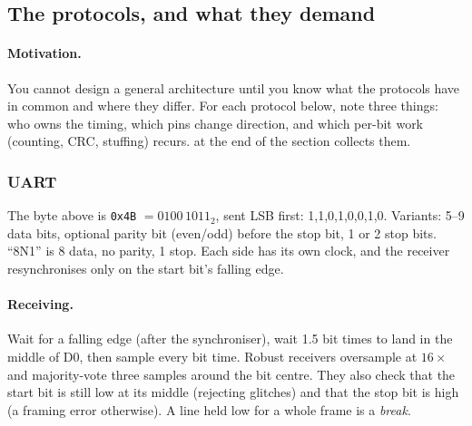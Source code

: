 \subsection{The protocols, and what they demand}\label{sec:protocols}

\paragraph{Motivation.} You cannot design a general architecture until you
know what the protocols have in common and where they differ. For each
protocol below, note three things: who owns the timing, which pins change
direction, and which per-bit work (counting, CRC, stuffing) recurs.
 at the end of the section collects them.

\subsubsection{UART}\label{sec:uart}

\begin{center}
\end{center}
The byte above is \texttt{0x4B} $=0100\,1011_2$, sent LSB first:
1,1,0,1,0,0,1,0. Variants: 5--9 data bits, optional parity bit (even/odd)
before the stop bit, 1 or 2 stop bits. ``8N1'' is 8 data, no parity, 1 stop.
Each side has its own clock, and the receiver resynchronises only on the
start bit's falling edge.

\paragraph{Receiving.} Wait for a falling edge (after the synchroniser), wait
1.5 bit times to land in the middle of D0, then sample every bit time.
Robust receivers oversample at $16\times$ and majority-vote three samples
around the bit centre. They also check that the start bit is still low at
its middle (rejecting glitches) and that the stop bit is high (a framing
error otherwise). A line held low for a whole frame is a \emph{break}.

